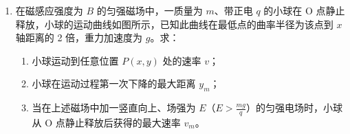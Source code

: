 \documentclass[\gkver]{gaokaozhenti}
\begin{document}
\begin{enumerate}
\begin{enumerate}
	\item
	若球在 O 点正上方以速度 $v_{2}$ 水平发出，恰好在最高点时越过球网，落在球台的 $P_{2}$ 点（如图虚线所示），求 $v_{2}$ 的大小；
	
	\item
	若球在 O 点正上方水平发出后，球经反弹恰好越过球网且刚好落在对方球台边缘 $P_{3}$ 处，求发球点距 O 点的高度 $h_{3}$。
\end{enumerate}




\item
在磁感应强度为 $B$ 的匀强磁场中，一质量为 $m$、带正电 $q$ 的小球在 O 点静止释放，小球的运动曲线如图所示，已知此曲线在最低点的曲率半径为该点到 $x$ 轴距离的 2 倍，重力加速度为 $g$。求：

\begin{enumerate}
	\item
	小球运动到任意位置 $P(x,y)$ 处的速率 $v$；
	
	\item
	小球在运动过程第一次下降的最大距离 $y_{m}$；
	
	\item
	当在上述磁场中加一竖直向上、场强为 $E$（$E>\frac{mg}{q}$）的匀强电场时，小球从 O 点静止释放后获得的最大速率 $v_{m}$。
\end{enumerate}


\end{enumerate}
\end{document}
